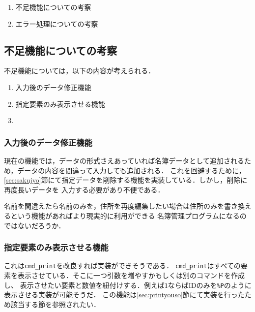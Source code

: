 \documentclass[a4j,11pt]{jarticle}
\begin{document}
\begin{enumerate}
\setlength{\parskip}{2pt} \setlength{\itemsep}{2pt}
    \item 不足機能についての考察
    \item エラー処理についての考察
\end{enumerate}

\subsection{不足機能についての考察}\label{sec:husoku}
不足機能については，以下の内容が考えられる．
\begin{enumerate}
\setlength{\parskip}{2pt} \setlength{\itemsep}{2pt}
   \item 入力後のデータ修正機能
   \item 指定要素のみ表示させる機能
   \item  
\end{enumerate}
\subsubsection{入力後のデータ修正機能}
現在の機能では，データの形式さえあっていれば名簿データとして追加されるため，データの内容を間違って入力しても追加される．
これを回避するために，\ref{sec:sakujyo}節にて指定データを削除する機能を実装している．しかし，削除に再度長いデータを
入力する必要があり不便である．

名前を間違えたら名前のみを，住所を再度編集したい場合は住所のみを書き換えるという機能があればより現実的に利用ができる
名簿管理プログラムになるのではないだろうか．
\subsubsection{指定要素のみ表示させる機能}
これは\verb|cmd_print|を改良すれば実装ができそうである．
\verb|cmd_print|はすべての要素を表示させている．そこに一つ引数を増やすかもしくは別のコマンドを作成し、
表示させたい要素と数値を紐付けする．例えば$1$ならばIDのみを\verb|%P|のように表示させる実装が可能そうだ．
この機能は\ref{sec:printyouso}節にて実装を行ったため該当する節を参照されたい．
\end{document}
